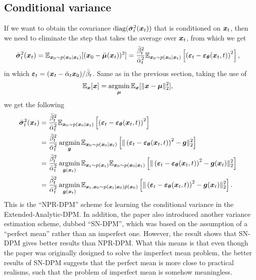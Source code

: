 \subsection{Conditional variance}
If we want to obtain the covariance $\mbox{diag}(\bar{\bm{\sigma}}_t^2(\bm{x}_{t}))$ that is conditioned on $\bm{x}_{t}$, then we need to eliminate the step that takes the average over $\bm{x}_{t}$, from which we get
\begin{equation}
    \label{eq:8.11}
    \bar{\bm{\sigma}}_t^2(\bm{x}_{t})=\mathbb{E}_{\bm{x}_0\sim p(\bm{x}_0|\bm{x}_{t})}[(\bm{x}_0-\bar{\bm{\mu}}(\bm{x}_{t}))^2]=\frac{\bar{\beta}_t^2}{\bar{\alpha}_t^2 }\mathbb{E}_{\bm{x}_0\sim p(\bm{x}_0|\bm{x}_{t})}\left[ \left( \bm{\varepsilon}_t-\bm{\varepsilon}_{\bm{\theta}}(\bm{x}_{t},t)  \right)^2 \right],
\end{equation}
 in which $\bm{\varepsilon}_t=(\bm{x}_{t}-\bar{\alpha}_t\bm{x}_0)/\bar{\beta}_t$. Same as in the previous section, taking the use of 
 \begin{equation}
     \label{eq:8.12}
     \mathbb{E}_{\bm{x}}[\bm{x}]=\operatorname*{argmin}_{\bm{\mu}}\mathbb{E}_{\bm{x}}[\|\bm{x}-\bm{\mu}\|_2^2],
 \end{equation}
we get the following
\begin{align}
    \bar{\bm{\sigma}}_t^2(\bm{x}_{t}) &= \frac{\bar{\beta}_t^2}{\bar{\alpha}_t^2 }\mathbb{E}_{\bm{x}_0\sim p(\bm{x}_0|\bm{x}_{t})}\left[ \left( \bm{\varepsilon}_t-\bm{\varepsilon}_{\bm{\theta}}(\bm{x}_{t},t)  \right)^2 \right]\nonumber\\
    &=\frac{\bar{\beta}_t^2}{\bar{\alpha}_t^2 } \operatorname*{argmin}_{\bm{g}}\mathbb{E}_{\bm{x}_0\sim p(\bm{x}_0|\bm{x}_{t})}\left[  \| \left( \bm{\varepsilon}_t-\bm{\varepsilon}_{\bm{\theta}}(\bm{x}_{t},t)  \right)^2 - \bm{g}\|_2^2\right]\nonumber\\
    &= \frac{\bar{\beta}_t^2}{\bar{\alpha}_t^2 } \operatorname*{argmin}_{\bm{g}(\bm{x}_{t})}\mathbb{E}_{\bm{x}_{t}\sim p(\bm{x}_{t})}\mathbb{E}_{\bm{x}_0\sim p(\bm{x}_0|\bm{x}_{t})}\left[  \| \left( \bm{\varepsilon}_t-\bm{\varepsilon}_{\bm{\theta}}(\bm{x}_{t},t)  \right)^2 - \bm{g}(\bm{x}_{t})\|_2^2\right]\nonumber\\
    &=\frac{\bar{\beta}_t^2}{\bar{\alpha}_t^2 } \operatorname*{argmin}_{\bm{g}(\bm{x}_{t})}\mathbb{E}_{\bm{x}_{t},\bm{x}_0\sim p(\bm{x}_{t}|\bm{x}_0)\tilde{p}(\bm{x}_0)} \left[  \| \left( \bm{\varepsilon}_t-\bm{\varepsilon}_{\bm{\theta}}(\bm{x}_{t},t)  \right)^2 - \bm{g}(\bm{x}_{t})\|_2^2\right] \label{eq:8.13}.
\end{align}
 This is the ``NPR-DPM'' scheme for learning the conditional variance in the Extended-Analytic-DPM. In addition, the paper also introduced another variance estimation scheme, dubbed ``SN-DPM'', which was based on the assumption of a ``perfect mean'' rather than an imperfect one. However, the result shows that SN-DPM gives better results than NPR-DPM. What this means is that even though the paper was originally designed to solve the imperfect mean problem, the better results of SN-DPM suggests that the perfect mean is more close to practical realisms, such that the problem of imperfect mean is somehow meaningless.
 
